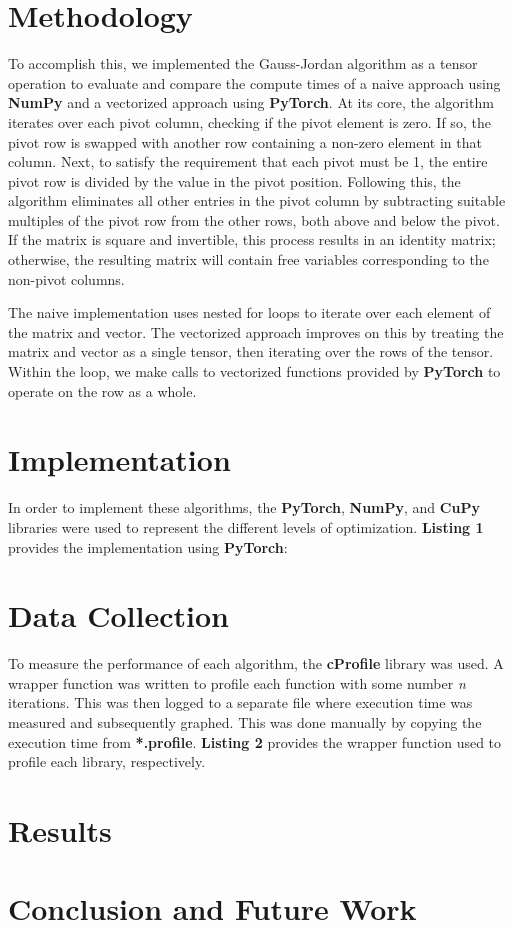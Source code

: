 \documentclass[12pt]{article}
\begin{document}
\section{Methodology}

To accomplish this, we implemented the Gauss-Jordan algorithm as a tensor operation to evaluate and compare the compute times of a naive approach using \textbf{NumPy} and a vectorized approach using \textbf{PyTorch}. At its core, the algorithm iterates over each pivot column, checking if the pivot element is zero. If so, the pivot row is swapped with another row containing a non-zero element in that column. Next, to satisfy the requirement that each pivot must be 1, the entire pivot row is divided by the value in the pivot position. Following this, the algorithm eliminates all other entries in the pivot column by subtracting suitable multiples of the pivot row from the other rows, both above and below the pivot. If the matrix is square and invertible, this process results in an identity matrix; otherwise, the resulting matrix will contain free variables corresponding to the non-pivot columns.

The naive implementation uses nested for loops to iterate over each element of the matrix and vector. The vectorized approach improves on this by treating the matrix and vector as a single tensor, then iterating over the rows of the tensor. Within the loop, we make calls to vectorized functions provided by \textbf{PyTorch} to operate on the row as a whole.

\section{Implementation}

In order to implement these algorithms, the \textbf{PyTorch}, \textbf{NumPy}, and \textbf{CuPy} libraries were used to represent the different levels of optimization. \textbf{Listing 1} provides the implementation using \textbf{PyTorch}:
\hfill\break

\lstset{style=mystyle}



\section{Data Collection}
To measure the performance of each algorithm, the \textbf{cProfile} library was used. A wrapper function was written to profile each function with some number \textit{n} iterations. This was then logged to a separate file where execution time was measured and subsequently graphed. This was done manually by copying the execution time from \textbf{*.profile}. \textbf{Listing 2} provides the wrapper function used to profile each library, respectively.
\hfill\break



\section{Results}

\section{Conclusion and Future Work}

\newpage


\end{document}
